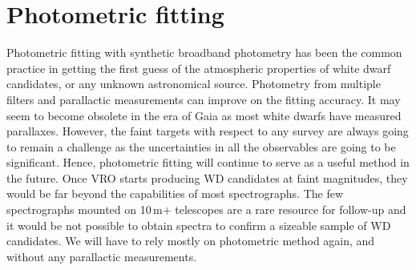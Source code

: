 \documentclass[fleqn,usenatbib]{rasti}
\begin{document}
\section{Photometric fitting}
Photometric fitting with synthetic broadband photometry has been the common
practice in getting the first guess of the atmospheric properties of white
dwarf candidates, or any unknown astronomical source. Photometry from multiple
filters and parallactic measurements can improve on the fitting accuracy.
It may seem to become obsolete in the era of Gaia as most white
dwarfs have measured parallaxes. However, the faint targets with respect to any
survey are always going to remain a challenge as the uncertainties in all the
observables are going to be significant. Hence, photometric fitting will
continue to serve as a useful method in the future. Once VRO starts producing
WD candidates at faint magnitudes, they would be far beyond the capabilities
of most spectrographs. The few spectrographs mounted on 10\,m$+$ telescopes are a
rare resource for follow-up and it would be not possible to obtain spectra
to confirm a sizeable sample of WD candidates. We will have to rely mostly
on photometric method again, and without any parallactic measurements.
\end{document}
